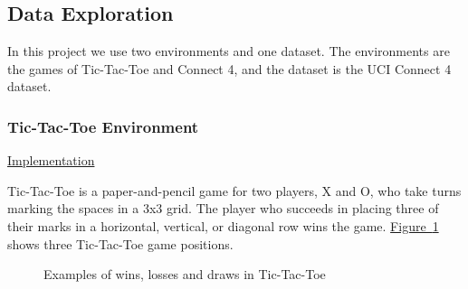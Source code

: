 \documentclass{article}
\newcommand{\GithubURL}[2]{
\noindent
\href{https://github.com/davidrobles/mlnd-capstone-code/blob/master/#1}{#2}
\break
}
\begin{document}
\subsection{Data Exploration}

In this project we use two environments and one dataset. The environments are the games of
Tic-Tac-Toe and Connect 4, and the dataset is the UCI Connect 4 dataset.

\subsubsection{Tic-Tac-Toe Environment}

\GithubURL{capstone/game/games/tictactoe.py}{Implementation}

Tic-Tac-Toe is a paper-and-pencil game for two players, X and O, who take turns marking the spaces
in a 3x3 grid. The player who succeeds in placing three of their marks in a horizontal, vertical, or
diagonal row wins the game. \hyperref[fig:tic-env]{Figure~\ref*{fig:tic-env}} shows three
Tic-Tac-Toe game positions.


\begin{figure}[!h]
    \centering
     \hspace{0.2in}
     \hspace{0.2in}
    \caption{Examples of wins, losses and draws in Tic-Tac-Toe}
    \label{fig:tic-env}
\end{figure}
\end{document}
